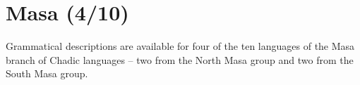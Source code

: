 \chapter{Masa (4/10)}

Grammatical descriptions are available for four of the ten languages of the Masa branch of Chadic languages -- two from the North Masa group and two from the South Masa group.




